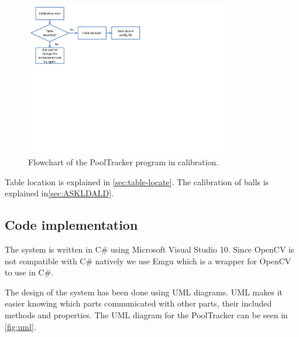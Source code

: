 \begin{figure}[H]
\begin{center}
\leavevmode
\includegraphics[width=0.8\textwidth]{images/calib_flowchart}
\end{center}
\caption{Flowchart of the PoolTracker program in calibration.}
\label{fig:program_flowchart}
\end{figure}

Table location is explained in \ref{sec:table-locate}. The calibration of balls is explained in\ref{sec:ASKLDALD}.

\subsection{Code implementation}
The system is written in C\# using Microsoft Visual Studio 10. Since OpenCV\cite{opencv} is not compatible with C\# natively we use Emgu\cite{emgu} which is a wrapper for OpenCV to use in C\#. 

The design of the system has been done using UML diagrams. UML makes it easier knowing which parts communicated with other parts, their included methods and properties. The UML diagram for the PoolTracker can be seen in \ref{fig:uml}.


